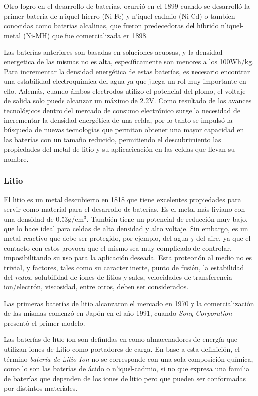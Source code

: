 \documentclass[10pt,a4paper]{article}
\begin{document}
\noindent Otro logro en el desarrollo de baterías, ocurrió en el 1899 cuando se
desarrolló la primer batería de n'iquel-hierro (Ni-Fe) y n'iquel-cadmio (Ni-Cd) o
tambien conocidas como baterias alcalinas, que fueron predecedoras del híbrido
n'iquel-metal (Ni-MH) que fue comercializada en 1898.

\noindent Las baterías anteriores son basadas en soluciones acuosas, y la
densidad energetica de las mismas no es alta, espec\'ificamente son menores a 
los 100Wh/kg. Para incrementar la densidad energética de estas baterías, es
necesario encontrar una estabilidad electroquímica del agua ya que juega un rol
muy importante en ello. Además, cuando \'ambos electrodos utilizo el potencial 
del plomo, el voltaje de salida solo puede alcanzar un máximo de 2.2V.
Como resultado de los avances tecnol\'ogicos dentro del mercado de consumo
electr\'onico surge la necesidad de incrementar la densidad  energética de una 
celda, por lo tanto se impuls\'o la b\'usqueda de nuevas tecnolog\'ias que
permitan obtener una mayor capacidad en las bater\'ias con un tamaño reducido, 
permitiendo el descubrimiento las propiedades del metal de litio y su 
aplicacicación en las celdas que llevan su nombre.

\subsubsection{Litio}

El litio es un metal descubierto en 1818 que tiene excelentes propiedades para
servir como material para el desarrollo de baterías. Es el metal m\'as liviano
con una densidad de 0.53$\mathrm{g/cm^3}$. Tambi\'en tiene un potencial de
reducci\'on muy bajo, que lo hace ideal para celdas de alta densidad y alto
voltaje. Sin embargo, es un metal reactivo que debe ser protegido, por ejemplo,
del agua y del aire, ya que el contacto con estos provoca que el mismo sea muy
complicado de controlar, imposibilitando su uso para la aplicación deseada. Esta
protección al medio no es trivial, y factores, tales como su caracter inerte,
punto de fusión, la estabilidad del \emph{redox}, solubilidad de iones de litios
y sales, velocidades de transferencia ion/electrón, viscosidad, entre otros,
deben ser considerados.

\noindent Las primeras baterías de litio alcanzaron el mercado en 1970 y la
comercialización de las mismas comenzó en Japón en el año 1991, cuando
\emph{Sony Corporation} presentó el primer modelo.

\noindent Las baterías de litio-ion son definidas en \cite{def_liion} como
almacenadores de energía que utilizan iones de Litio como portadores de carga.
En base a esta definición, el término \emph{batería de Litio-Ion} no se
corresponde con una sola composición química, como lo son las baterías de ácido
o n'iquel-cadmio, si no que expresa una familia de baterías que dependen de los
iones de litio pero que pueden ser conformadas por distintos materiales.
\end{document}
